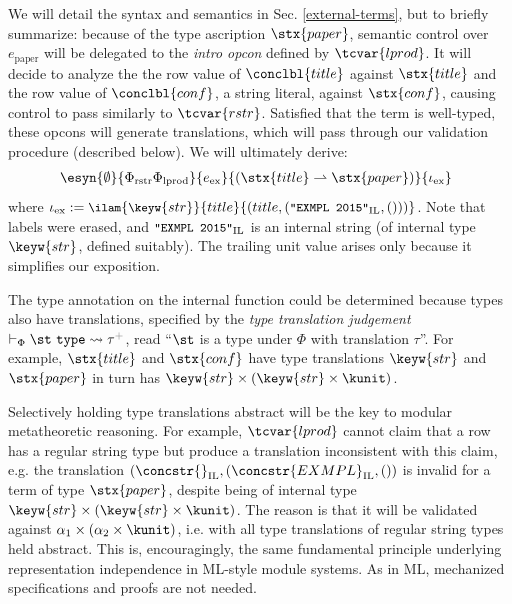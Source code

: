 We will detail the syntax and semantics in Sec. \ref{external-terms}, but to briefly summarize: because of the type ascription $\stx{paper}$, semantic control over $e_\text{paper}$ will be delegated to the \emph{intro opcon} defined by $\tcvar{lprod}$. It will decide to analyze the the row value of $\conclbl{title}$ against $\stx{title}$ and the row value of $\conclbl{conf}$, a string literal, against $\stx{conf}$, causing control to pass similarly to $\tcvar{rstr}$. Satisfied that the term is well-typed, these opcons will generate translations, which will pass through our validation procedure (described below). We will ultimately derive:
\[\hspace{-5px}\begin{array}{l}\esyn{\emptyset}{\Phi_\text{rstr}\Phi_\text{lprod}}{e_\text{ex}}{(\stx{title}\rightharpoonup\stx{paper})}{\iota_\text{ex}}\end{array}\]
where $\small\iota_\text{ex} := \ilam{\keyw{str}}{title}{(title, (\texttt{"EXMPL 2015"}_\text{IL}, ()))}$. Note that labels were erased, and $\small\texttt{"EXMPL 2015"}_\text{IL}$ is an internal string (of internal type $\keyw{str}$, defined suitably). The trailing unit value arises only because it simplifies our exposition. 

The type annotation on the internal function could be determined because types also have translations, specified by the \emph{type translation judgement} $\vdash_\Phi \st~\mathtt{type} \leadsto \tau\moutput$, read ``$\st$ is a type under $\Phi$ with translation $\tau$''. For example, $\stx{title}$  and $\stx{conf}$ have type translations  $\keyw{str}$ and  $\stx{paper}$ in turn has $\keyw{str}\times(\keyw{str}\times\kunit)$. 

Selectively holding type translations abstract will be the key to modular metatheoretic reasoning. For example, $\tcvar{lprod}$ cannot claim that a row has a regular string type but produce a translation inconsistent with this claim, e.g. the translation $(\concstr{}_\text{IL}, (\concstr{EXMPL}_\text{IL}, ())$ is invalid for a term of type $\stx{paper}$, despite being of internal type $\keyw{str}\times(\keyw{str}\times\kunit)$. The reason is that it will be validated against $\alpha_1 \times (\alpha_2 \times \kunit)$, i.e. with all type translations of regular string types held abstract. This is, encouragingly, the same fundamental principle underlying representation independence in ML-style module systems. As in ML, mechanized specifications and proofs are not needed.

